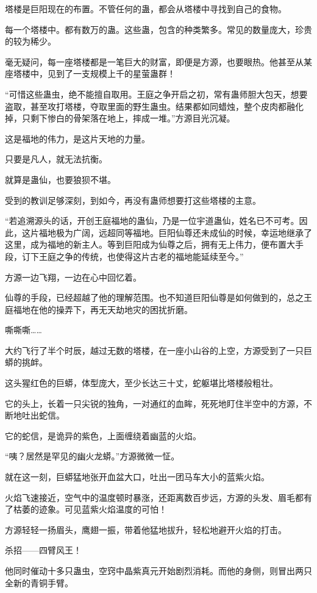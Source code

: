 \begin{this_body}
塔楼是巨阳现在的布置。不管任何的蛊，都会从塔楼中寻找到自己的食物。

每一个塔楼中。都有数万的蛊。这些蛊，包含的种类繁多。常见的数量庞大，珍贵的较为稀少。

毫无疑问，每一座塔楼都是一笔巨大的财富，即便是方源，也要眼热。他甚至从某座塔楼中，见到了一支规模上千的星萤蛊群！

“可惜这些蛊虫，绝不能擅自取用。王庭之争开启之初，常有蛊师胆大包天，想要盗取，甚至攻打塔楼，夺取里面的野生蛊虫。结果都如同蜡烛，整个皮肉都融化掉，只剩下惨白的骨架落在地上，摔成一堆。”方源目光沉凝。

这是福地的伟力，是这片天地的力量。

只要是凡人，就无法抗衡。

就算是蛊仙，也要狼狈不堪。

受到的教训足够深刻，到如今，再没有蛊师想要打这些塔楼的主意。

“若追溯源头的话，开创王庭福地的蛊仙，乃是一位宇道蛊仙，姓名已不可考。因此，这片福地极为广阔，远超同等福地。巨阳仙尊还未成仙的时候，幸运地继承了这里，成为福地的新主人。等到巨阳成为仙尊之后，拥有无上伟力，便布置大手段，订下王庭之争的传统，也使得这片古老的福地能延续至今。”

方源一边飞翔，一边在心中回忆着。

仙尊的手段，已经超越了他的理解范围。也不知道巨阳仙尊是如何做到的，总之王庭福地在他的操弄下，再无天劫地灾的困扰折磨。

嘶嘶嘶……

大约飞行了半个时辰，越过无数的塔楼，在一座小山谷的上空，方源受到了一只巨蟒的挑衅。

这头猩红色的巨蟒，体型庞大，至少长达三十丈，蛇躯堪比塔楼般粗壮。

它的头上，长着一只尖锐的独角，一对通红的血眸，死死地盯住半空中的方源，不断地吐出蛇信。

它的蛇信，是诡异的紫色，上面缠绕着幽蓝的火焰。

“咦？居然是罕见的幽火龙蟒。”方源微微一怔。

就在这一刻，巨蟒猛地张开血盆大口，吐出一团马车大小的蓝紫火焰。

火焰飞速接近，空气中的温度顿时暴涨，还距离数百步远，方源的头发、眉毛都有了枯萎的迹象。可见蓝紫火焰温度的可怕！

方源轻轻一扬眉头，鹰翅一振，带着他猛地拔升，轻松地避开火焰的打击。

杀招——四臂风王！

他同时催动十多只蛊虫，空窍中晶紫真元开始剧烈消耗。而他的身侧，则冒出两只全新的青铜手臂。


\end{this_body}
